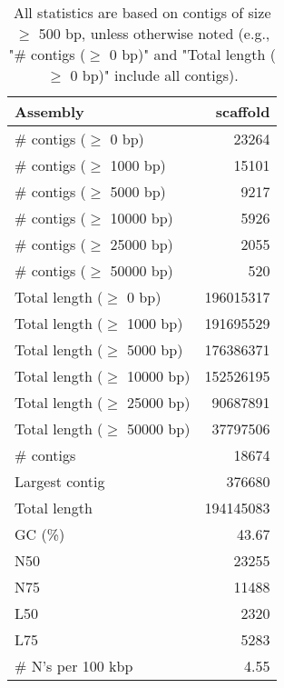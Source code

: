 \documentclass[12pt,a4paper]{article}
\begin{document}
\begin{table}[ht]
\begin{center}
\caption{All statistics are based on contigs of size $\geq$ 500 bp, unless otherwise noted (e.g., "\# contigs ($\geq$ 0 bp)" and "Total length ($\geq$ 0 bp)" include all contigs).}
\begin{tabular}{|l*{1}{|r}|}
\hline
Assembly & scaffold \\ \hline
\# contigs ($\geq$ 0 bp) & 23264 \\ \hline
\# contigs ($\geq$ 1000 bp) & 15101 \\ \hline
\# contigs ($\geq$ 5000 bp) & 9217 \\ \hline
\# contigs ($\geq$ 10000 bp) & 5926 \\ \hline
\# contigs ($\geq$ 25000 bp) & 2055 \\ \hline
\# contigs ($\geq$ 50000 bp) & 520 \\ \hline
Total length ($\geq$ 0 bp) & 196015317 \\ \hline
Total length ($\geq$ 1000 bp) & 191695529 \\ \hline
Total length ($\geq$ 5000 bp) & 176386371 \\ \hline
Total length ($\geq$ 10000 bp) & 152526195 \\ \hline
Total length ($\geq$ 25000 bp) & 90687891 \\ \hline
Total length ($\geq$ 50000 bp) & 37797506 \\ \hline
\# contigs & 18674 \\ \hline
Largest contig & 376680 \\ \hline
Total length & 194145083 \\ \hline
GC (\%) & 43.67 \\ \hline
N50 & 23255 \\ \hline
N75 & 11488 \\ \hline
L50 & 2320 \\ \hline
L75 & 5283 \\ \hline
\# N's per 100 kbp & 4.55 \\ \hline
\end{tabular}
\end{center}
\end{table}
\end{document}
